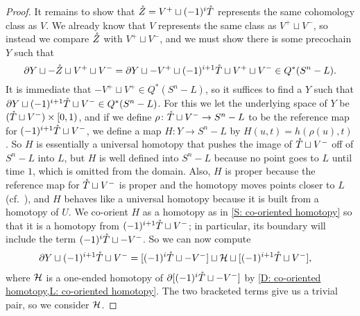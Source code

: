 \begin{proof}
	It remains to show that $\mathring{Z} = V^+ \sqcup (-1)^i\mathring{T}$ represents the same cohomology class as $V$.
	We already know that $V$ represents the same class as $V^+ \sqcup V^-$, so instead we compare $\mathring{Z}$ with $V^+ \sqcup V^-$, and we must show there is some precochain $Y$ such that
	$$\partial Y \sqcup -\mathring{Z}\sqcup V^+\sqcup V^- = \partial Y \sqcup -V^+ \sqcup (-1)^{i+1}\mathring{T} \sqcup V^+ \sqcup V^- \in Q^*(S^n-L).$$
	It is immediate that $-V^+ \sqcup V^+ \in Q^*(S^n-L)$, so it suffices to find a $Y$ such that
	$\partial Y \sqcup (-1)^{i+1} \mathring{T} \sqcup V^- \in Q^*(S^n-L)$.
	For this we let the underlying space of $Y$ be $(\mathring{T} \sqcup V^-) \times [0,1)$, and if we define $\rho \colon \mathring{T} \sqcup V^- \to S^n -L$ to be the reference map for $(-1)^{i+1}\mathring{T} \sqcup V^-$, we define a map $H \colon Y \to S^n-L$ by $H(u,t) = h(\rho(u),t)$.
	So $H$ is essentially a universal homotopy that pushes the image of $\mathring{T} \sqcup V^-$ off of $S^n-L$ into $L$, but $H$ is well defined into $S^n-L$ because no point goes to $L$ until time $1$, which is omitted from the domain.
	Also, $H$ is proper because the reference map for $\mathring{T} \sqcup V^-$ is proper and the homotopy moves points closer to $L$ (cf.\ \cite[Corollory I.10.3.7]{Bou98}), and $H$ behaves like a universal homotopy because it is built from a homotopy of $U$.
	We co-orient $H$ as a homotopy as in \cref{S: co-oriented homotopy} so that it is a homotopy from $(-1)^{i+1}\mathring{T} \sqcup V^-$; in particular, its boundary will include the term $(-1)^{i}\mathring{T} \sqcup - V^-$.
	So we can now compute
	\begin{align*}
		\partial Y \sqcup (-1)^{i+1} \mathring{T} \sqcup V^-
		&= [(-1)^{i}\mathring{T} \sqcup - V^-] \sqcup \mathcal{H} \sqcup [(-1)^{i+1} \mathring{T} \sqcup V^-],
	\end{align*}
	where $\mathcal{H}$ is a one-ended homotopy of $\partial[ (-1)^i\mathring{T} \sqcup - V^-]$ by \cref{D: co-oriented homotopy,L: co-oriented homotopy}.
	The two bracketed terms give us a trivial pair, so we consider
	$\mathcal{H}$.


\end{proof}
